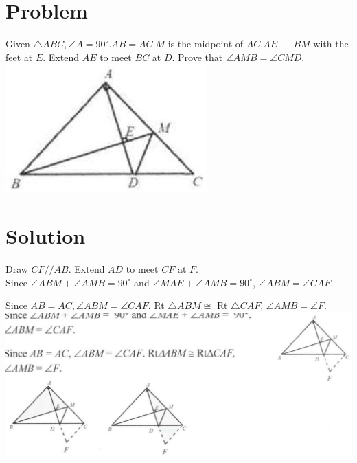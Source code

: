 \documentclass{article}
\begin{document}
\section*{Problem}
Given \(\triangle A B C, \angle A=90^{\circ} . A B=A C . M\) is the midpoint of \(A C . A E \perp\) \(B M\) with the feet at \(E\). Extend \(A E\) to meet \(B C\) at \(D\). Prove that \(\angle A M B=\angle C M D\).\\
\centering
\includegraphics[width=\textwidth]{images/129(3).jpg}

\section*{Solution}
Draw \(C F / / A B\). Extend \(A D\) to meet \(C F\) at \(F\).\\
Since \(\angle A B M+\angle A M B=90^{\circ}\) and \(\angle M A E+\angle A M B=90^{\circ}\), \(\angle A B M=\angle C A F\).

Since \(A B=A C, \angle A B M=\angle C A F\). Rt \(\triangle A B M \cong\) Rt \(\triangle C A F\), \(\angle A M B=\angle F\).\\
\centering
\includegraphics[width=\textwidth]{images/139(1).jpg}
\end{document}
